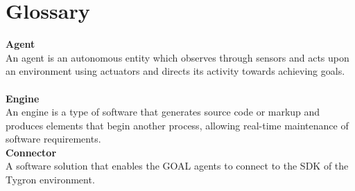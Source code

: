 \section{Glossary}

\textbf{Agent}\\
An agent is an autonomous entity which observes through sensors and acts upon an environment using actuators and directs its activity towards achieving goals.\\\\
\textbf{Engine}\\
An engine is a type of software that generates source code or markup and produces elements that begin another process, allowing real-time maintenance of software requirements.\\
\textbf{Connector}\\
A software solution that enables the GOAL agents to connect to the SDK of the Tygron environment.
\textbf{}
\textbf{}